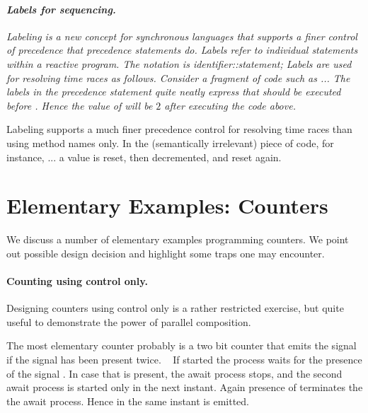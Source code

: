 \paragraph{\textit{Labels for sequencing.}}
{\em Labeling is a new concept for synchronous languages that supports
a finer control of precedence that precedence statements do. Labels 
refer to individual statements within a reactive program.  The notation 
is\index{\pp{::}}
% 
\BEP
\textit{identifier}::\textit{statement};
\EEP
% 
Labels are used for resolving time races as follows. Consider a fragment of code such as
%
\BEP
...
\EEP
{}
%
The labels in the precedence statement quite neatly express that
 should be executed before . Hence
the value of  will be $2$ after executing the code above.

Labeling supports a much finer precedence control for resolving time 
races than using method names only. In the (semantically irrelevant) 
piece of code, for instance,
%
\BEP
...
\EEP
{}
%
a value is reset, then decremented, and reset again.
}

\section{Elementary Examples: Counters}\label{counter}

We discuss a number of elementary examples programming counters. We 
point out possible design decision and highlight some traps one may 
encounter.

\paragraph{Counting using control only.}

Designing counters using control only is a rather restricted 
exercise, 
but quite useful to demonstrate the power of parallel composition.

The most elementary counter probably is a two bit counter that emits
the signal  if the signal  has been present
twice.
%
\
%
If started the process waits for the presence of the signal 
. 
In case that  is present, the await process stops, and the 
second await process is started only in the next instant. Again 
presence of \pp{incr} terminates the the await process. Hence in the 
same instant \pp{elapsed} is emitted. 

